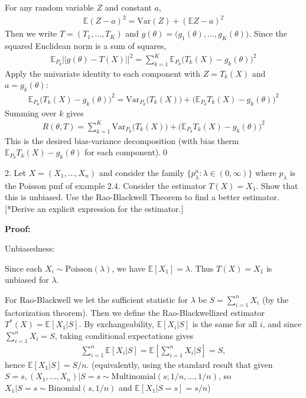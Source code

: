\documentclass[10pt]{article}
\begin{document}
For any random variable $Z $ and constant $a $,
\begin{gather*}
    \mathbb{E}(Z - a)^2 = \text{Var}(Z) + (\mathbb{E}Z - a)^2
\end{gather*}
Then we write $T = (T_1, …, T_K)$ and $g(\theta) = \big(g_1(\theta), …, g_K(\theta)\big)$. Since the squared Euclidean norm is a sum of squares, 
\begin{gather*}
    \mathbb{E}_{P_\theta}||g(\theta) - T(X)||^2 = \sum_{k = 1}^{K}\mathbb{E}_{P_\theta}\big(T_k(X) - g_k(\theta)\big)^2
\end{gather*}
Apply the univariate identity to each component with $Z = T_k(X)$ and $a = g_k(\theta)$:
\begin{gather*}
    \mathbb{E}_{P_\theta}\big(T_k(X) - g_k(\theta)\big)^2 = \text{Var}_{P_\theta}\big(T_k(X)\big) + \big(\mathbb{E}_{P_\theta}T_k(X) - g_k(\theta)\big)^2
\end{gather*}
Summing over $k $ gives 
\begin{gather*}
    R(\theta, T) = \sum_{k = 1}^{K}\text{Var}_{P_\theta}\big(T_k(X)\big) + \big(\mathbb{E}_{P_\theta}T_k(X) - g_k(\theta)\big)^2
\end{gather*}
This is the desired bias-variance decomposition (with bias therm $\mathbb{E}_{P_\theta}T_k(X) - g_k(\theta)$ for each component).\qed
\newpage 

2. Let $X = (X_1, …, X_n)$ and consider the family $\{p_\lambda^n : \lambda\in(0,\infty)\}$ where $p_\lambda $ is the Poisson pmf of example 2.4. Consider the estimator $T(X) = X_1 $. Show that this is unbiased. Use the Rao-Blackwell Theorem to find a better estimator. [*Derive an explicit expression for the estimator.]

\textbf{Proof:}

Unbiasedness: 

Since each $X_i \sim \text{Poisson}(\lambda)$, we have $\mathbb{E}[X_1] = \lambda $. Thus $T(X) = X_1 $ is unbiased for $\lambda $.

For Rao-Blackwell we let the sufficient statistic for $\lambda $ be $S = \sum_{i = 1}^{n}X_i $ (by the factorization theorem). Then we define the Rao-Blackwellized estimator $T^*(X) = \mathbb{E}[X_1 | S]$. By exchangeability, $\mathbb{E}[X_i | S]$ is the same for all $i $, and since $\sum_{i = 1}^{n}X_i = S $, taking conditional expectations gives 
\begin{gather*}
    \sum_{i = 1}^{n}\mathbb{E}[X_i | S] = \mathbb{E}\left[\sum_{i = 1}^{n}X_i | S\right] = S,
\end{gather*}
hence $\mathbb{E}[X_1 | S] = S/n $. (equivalently, using the standard result that given $S = s, (X_1, …, X_n) | S = s \sim\text{Multinomial}(s;1 / n, …, 1 / n)$, so $X_1 | S = s \sim \text{Binomial}(s, 1 / n)$ and $\mathbb{E}[X_1 | S = s] = s / n $)
\end{document}
